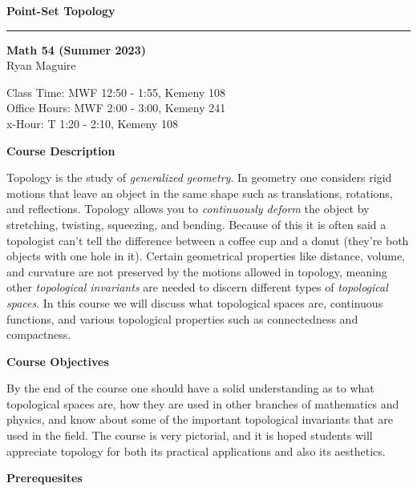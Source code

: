 \documentclass{article}
\begin{document}
    \LARGE
    \textbf{Point-Set Topology}
    \hrule\par\hfill\par
    \normalsize
    \textbf{Math 54 (Summer 2023)}\\
    Ryan Maguire\\
    \color{gray}{Ryan.J.Maguire.GR@dartmouth.edu}
    \par\vspace{0.5cm}
    \color{black}
    Class Time: MWF 12:50 - 1:55, Kemeny 108\\
    Office Hours: MWF 2:00 - 3:00, Kemeny 241\\
    x-Hour: T 1:20 - 2:10, Kemeny 108
    \par\vspace{0.5cm}
    \textbf{Course Description}
    \par\hfill\par
    Topology is the study of \textit{generalized geometry}. In geometry one
    considers rigid motions that leave an object in the same shape such as
    translations, rotations, and reflections. Topology allows you to
    \textit{continuously deform} the object by stretching, twisting, squeezing,
    and bending. Because of this it is often said a topologist can't tell the
    difference between a coffee cup and a donut (they're both objects with
    one hole in it). Certain geometrical properties like distance, volume,
    and curvature are not preserved by the motions allowed in topology,
    meaning other \textit{topological invariants} are needed to discern
    different types of \textit{topological spaces}. In this course we will
    discuss what topological spaces are, continuous functions, and various
    topological properties such as connectedness and compactness.
    \par\hfill\par
    \textbf{Course Objectives}
    \par\hfill\par
    By the end of the course one should have a solid understanding as to what
    topological spaces are, how they are used in other branches of mathematics
    and physics, and know about some of the important topological invariants
    that are used in the field. The course is very pictorial, and it is hoped
    students will appreciate topology for both its practical applications and
    also its aesthetics.
    \par\hfill\par
    \textbf{Prerequesites}
    \par\hfill\par
\end{document}
